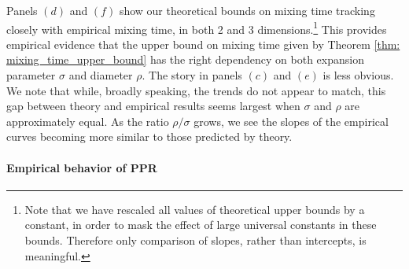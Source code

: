 \documentclass{article}
\newcommand{\1}{\mathbf{1}}
\newcommand{\ppr}{{\sc PPR}}
\theoremstyle{aldenthm}
\theoremstyle{aldenrmrk}
\begin{document}
Panels $(d)$ and $(f)$ show our theoretical bounds on mixing time tracking closely with empirical mixing time, in both 2 and 3 dimensions.\footnote{Note that we have rescaled all values of theoretical upper bounds by a constant, in order to mask the effect of large universal constants in these bounds. Therefore only comparison of slopes, rather than intercepts, is meaningful.} This provides empirical evidence that the upper bound on mixing time given by Theorem \ref{thm: mixing_time_upper_bound} has the right dependency on both expansion parameter $\sigma$ and diameter $\rho$. The story in panels $(c)$ and $(e)$ is less obvious. We note that while, broadly speaking, the trends do not appear to match, this gap between theory and empirical results seems largest when $\sigma $ and $\rho$ are approximately equal. As the ratio $\rho/\sigma$ grows, we see the slopes of the empirical curves becoming more similar to those predicted by theory.

\paragraph{Empirical behavior of \ppr}
\end{document}
